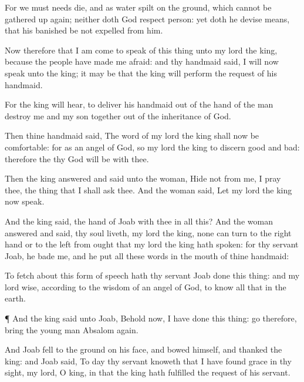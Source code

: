 {For we must
needs
die, and
{} as
water
spilt on the
ground, which cannot be gathered up
again; neither doth
God
respect
{}
person: yet doth he
devise
means, that his
banished be not
expelled from him.

Now therefore that I am
come to
speak of this
thing unto my
lord the
king,
{} because the
people have made me
afraid: and thy
handmaid
said, I will now
speak unto the
king; it may be that the
king will
perform the
request of his
handmaid.

For the
king will
hear, to
deliver his
handmaid out of the
hand of the
man
{}
destroy me and my
son
together out of the
inheritance of
God.

Then thine
handmaid
said, The
word of my
lord the
king shall now be
comfortable: for as an
angel of
God, so
{} my
lord the
king to
discern
good and
bad: therefore the
{} thy
God will be with thee.

Then the
king
answered and
said unto the
woman,
Hide not from me, I pray thee, the
thing that I shall
ask thee. And the
woman
said, Let my
lord the
king now
speak.

And the
king
said,
{} the
hand of
Joab with thee in all this? And the
woman
answered and
said,
{} thy
soul
liveth, my
lord the
king,
none
can turn to the right
hand or to the
left from ought that my
lord the
king hath
spoken: for thy
servant
Joab, he
bade me, and he
put all these
words in the
mouth of thine
handmaid:

To fetch
about this
form of
speech hath thy
servant
Joab
done this
thing: and my
lord
{}
wise, according to the
wisdom of an
angel of
God, to
know all
{} that
{} in the
earth.


\par }{\PP {}¶ And the
king
said unto
Joab, Behold now, I have
done this
thing:
go therefore,
bring the young
man
Absalom
again.

And
Joab
fell to the
ground on his
face, and
bowed himself, and
thanked the
king: and
Joab
said, To
day thy
servant
knoweth that I have
found
grace in thy
sight, my
lord, O
king, in that the
king hath
fulfilled the
request of his
servant.

}
